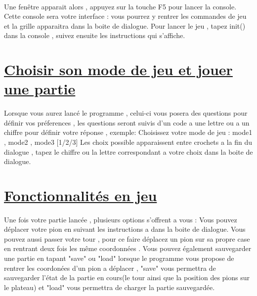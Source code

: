 \documentclass[a4paper,12pt]{article}
\begin{document}
\paragraph{}
Une fenêtre apparait alors , appuyez sur la touche F5 pour lancer la console.
Cette console sera votre interface : vous pourrez y rentrer les commandes de jeu et
la grille apparaitra dans la boite de dialogue.\newline
Pour lancer le jeu , tapez init() dans la console , suivez ensuite les instructions qui s'affiche.
\newline
\newline
\newline

\section{\underline{Choisir son mode de jeu et jouer une partie}}
\paragraph{}
Lorsque vous aurez lancé le programme , celui-ci vous posera des questions pour définir vos préferences
, les questions seront suivis d'un code a une lettre ou a un chiffre pour définir votre réponse , exemple:
\newline
Choisissez votre mode de jeu : mode1 , mode2 , mode3 [1/2/3]
\newline 
Les choix possible apparaissent entre crochets a la fin du dialogue , tapez le chiffre ou la lettre correspondant a votre choix dans la boite de dialogue.
\newline
\newline
\newline

\section{\underline{Fonctionnalités en jeu}}
\paragraph{}
Une fois votre partie lancée , plusieurs options s'offrent a vous : Vous pouvez déplacer votre pion en suivant les instructions a dans la boite de dialogue. Vous pouvez aussi passer votre tour , pour ce faire déplacez un pion sur sa propre case en rentrant deux fois les même coordonnées .
\newline
Vous pouvez également sauvegarder une partie en tapant "save" ou "load" lorsque le programme vous propose de rentrer les coordonées d'un pion a déplacer , "save" vous permettra de sauvegarder l'état de la partie en cours(le tour ainsi que la position des pions sur le plateau) et "load" vous permettra de charger la partie sauvegardée.
\newline
\newline
\newline
\end{document}
